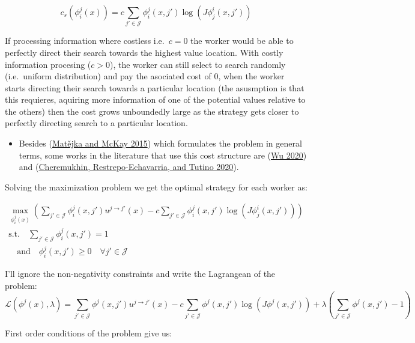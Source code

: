 \documentclass[
  letterpaper,
  DIV=11,
  numbers=noendperiod]{scrartcl}
\providecommand{\tightlist}{%
  \setlength{\itemsep}{0pt}\setlength{\parskip}{0pt}}\usepackage{longtable,booktabs,array}
\begin{document}
\begin{equation}
\label{eq-cost-search}
c_s(\phi^j_i(x)) = c \sum_{j'\in \mathcal{J}}\phi^j_i(x, j')\log{(J\phi^i_j(x, j'))}
\end{equation}

If processing information where costless i.e.~\(c = 0\) the worker would
be able to perfectly direct their search towards the highest value
location. With costly information procesing (\(c > 0\)), the worker can
still select to search randomly (i.e.~uniform distribution) and pay the
asociated cost of \(0\), when the worker starts directing their search
towards a particular location (the asusmption is that this requieres,
aquiring more information of one of the potential values relative to the
others) then the cost grows unboundedly large as the strategy gets
closer to perfectly directing search to a particular location.

\begin{itemize}
\tightlist
\item
  Besides
  (\protect\hyperlink{ref-matejkaRationalInattentionDiscrete2015}{Matějka
  and McKay 2015}) which formulates the problem in general terms, some
  works in the literature that use this cost structure are
  (\protect\hyperlink{ref-wuPartiallyDirectedSearch2020}{Wu 2020}) and
  (\protect\hyperlink{ref-cheremukhinTargetedSearchMatching2020}{Cheremukhin,
  Restrepo-Echavarria, and Tutino 2020}).
\end{itemize}

Solving the maximization problem we get the optimal strategy for each
worker as:

\begin{align*}
\max_{\phi_i^j(x)} \left( \sum_{j' \in \mathcal{J}} \phi_i^j(x, j') u^{j\to j'}(x) - c \sum_{j'\in \mathcal{J}}\phi^j_i(x, j')\log{(J\phi^i_j(x, j'))} \right) \\
\text{s.t.} \quad \sum_{j'\in \mathcal{J}}\phi^j_i(x, j') = 1 \\
\quad \text{and} \quad \phi^j_i(x, j') \geq 0 \quad \forall j' \in \mathcal{J}
\end{align*}

I'll ignore the non-negativity constraints and write the Lagrangean of
the problem:
\[\mathcal{L}(\phi^j(x), \lambda) =  \sum_{j'\in\mathcal{J}} \phi^j(x, j') u^{j\to j'}(x) - c \sum_{j'\in \mathcal{J}}\phi^j(x, j')\log{(J\phi^j(x, j'))} + \lambda \left(\sum_{j'\in \mathcal{J}}\phi^j(x, j') - 1\right)\]

First order conditions of the problem give us:
\end{document}
